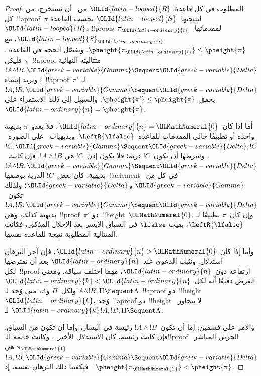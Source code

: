 \documentclass[../../../include/open-logic-section]{subfiles}
\begin{document}
\begin{proof}
المطلوب في كل قاعدة~$\OLId{latin-looped}{R}$ من~ أن نستخرج، من كل~!!a{proof}~$\pi$
لنتيجتها~$\OLId{latin-looped}{S}$ بحسب القاعدة~$\OLId{latin-looped}{R}$، !!{proof}s~$\pi_\OLId{latin-ordinary}{i}$ لمقدماتها~$\OLId{latin-looped}{S}_\OLId{latin-ordinary}{i}$، مع
$\pheight{\pi_\OLId{latin-ordinary}{i}}\leq\pheight{\pi}$. ونفصّل الحجة في القاعدة
\LeftR{\land}. فليكن~$\pi$~!!a{proof} متتاليته النهائية
$!A\land !B,\OLId{greek-variable}{Gamma}\Sequent\OLId{greek-variable}{Delta}$؛ ونريد إنشاء~!!a{proof}~$\pi'$
لـ$!A,!B,\OLId{greek-variable}{Gamma}\Sequent\OLId{greek-variable}{Delta}$ يحقق~$\pheight{\pi'}\leq
\pheight{\pi}$. والسبيل إلى ذلك الاستقراء على~$\OLId{latin-ordinary}{n}=\pheight{\pi}$.

أما إذا كان~$\OLId{latin-ordinary}{n}=\OLMathNumeral{0}$، فلا يعدو~$\pi$ بديهية واحدة أو تطبيقًا خالي المقدمات
للقاعدة~$\LeftR{\lfalse}$. وبديهيات~ على الصورة~$!C,\OLId{greek-variable}{Gamma}
\Sequent\OLId{greek-variable}{Delta},!C$، وشرطها أن تكون~$!C$ ذرية؛ فلا تكون إذن~$!C$ هي
$!A\land !B$. فإن كانت~$!A\land !B,\OLId{greek-variable}{Gamma}\Sequent\OLId{greek-variable}{Delta}$ بديهية، كان
بعض~$!C$ الذرية بوصفها~!!a{element} في كل من~$\OLId{greek-variable}{Gamma}$ و$\OLId{greek-variable}{Delta}$؛ ولذلك
تكون~$!A,!B,\OLId{greek-variable}{Gamma}\Sequent\OLId{greek-variable}{Delta}$ بديهية كذلك، وهي~!!{proof}~$\pi'$
ذو~!!{height}~$\OLMathNumeral{0}$. وإن كان~$\pi$ تطبيقًا لـ$\LeftR{\lfalse}$، بقيت
$\lfalse$ في السياق الأيسر بعد الإحلال المذكور، فكانت
المتتالية المطلوبة نتيجة للقاعدة نفسها.

وأما إذا كان~$\OLId{latin-ordinary}{n}>\OLMathNumeral{0}$، فإن آخر البرهان استدلال. ونثبت الدعوى عند~$\OLId{latin-ordinary}{n}$ بعد أن
نفترضها لكل~!!{proof} ارتفاعه دون~$\OLId{latin-ordinary}{n}$، مهما اختلف سياقه. ومعنى الفرض
دقيقًا أنه لكل~$\OLId{latin-ordinary}{k}<\OLId{latin-ordinary}{n}$ ولكل~$\Pi$ و$\Lambda$، متى وُجد لـ$!A\land
!B,\Pi\Sequent\Lambda$~!!a{proof} ذو~!!{height}~$\OLId{latin-ordinary}{k}$، وُجد~!!a{proof}
ذو~!!{height} لا يتجاوز~$\OLId{latin-ordinary}{k}$ لـ$!A,!B,\Pi\Sequent\Lambda$.

والأمر على قسمين: إما أن تكون~$!A\land !B$ رئيسة في اليسار، وإما أن
تكون من السياق. فإن كانت رئيسة، كان الاستدلال الأخير~\LeftR{\land}،
وكانت خاتمة الـ!!{proof} الجزئي المباشر~$\pi_\OLMathNumeral{1}$ هي
$!A,!B,\OLId{greek-variable}{Gamma}\Sequent\OLId{greek-variable}{Delta}$. فيكفينا ذلك البرهان نفسه، إذ
$\pheight{\pi_\OLMathNumeral{1}}<\pheight{\pi}$.


\end{proof}
\end{document}
